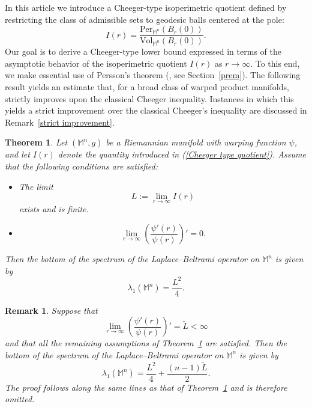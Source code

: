 \documentclass[a4paper,11pt,reqno]{amsart}
\renewcommand\eqref[1]{(\ref{#1})}
\theoremstyle{plain}
\newtheorem{theorem}{Theorem}[section]
\newtheorem{remark}{Remark}[section]
\numberwithin{equation}{section} \allowdisplaybreaks
\newcommand{\m}{\mathbb{M}^n}
\begin{document}
In this article we introduce a Cheeger-type isoperimetric quotient defined by restricting the class of admissible sets to geodesic balls centered at the pole:
\begin{equation}\label{Cheeger type quotient}
    I(r)=\frac{\text{Per}_{\m}(B_r(0))}{\text{Vol}_{\m}(B_r(0))}.
\end{equation}
Our goal is to derive a Cheeger-type lower bound expressed in terms of the asymptotic behavior of the isoperimetric quotient $I(r)$ as $r\to \infty$. To this end, we make essential use of Persson’s theorem (\cite{Persson}, see Section~\ref{prem}). The following result yields an estimate that, for a broad class of warped product manifolds, strictly improves upon the classical Cheeger inequality. Instances in which this yields a strict improvement over the classical Cheeger's inequality are discussed in Remark~\ref{strict improvement}.

\begin{theorem}\label{fourth}
Let $(\m,g)$ be a Riemannian manifold with warping function $\psi$, and let $I(r)$ denote the quantity introduced in \eqref{Cheeger type quotient}. 
Assume that the following conditions are satisfied:
\begin{itemize}
    \item[(i)] The limit 
    \[
        L := \lim_{r \to \infty} I(r)
    \]
    exists and is finite.
    
    \item[(ii)] 
    \[
        \lim_{r \to \infty} \left( \frac{\psi'(r)}{\psi(r)} \right)' = 0.
    \]
\end{itemize}
Then the bottom of the spectrum of the Laplace--Beltrami operator on $\m$ is given by
\begin{equation}\label{eq:lambda-explicit}
    \lambda_1(\m) = \frac{L^2}{4}.
\end{equation}
\end{theorem}


\medskip 


\begin{remark}
{\rm 
Suppose that 
\begin{equation*}
    \lim_{r \to \infty}\left(\frac{\psi'(r)}{\psi(r)}\right)'=\tilde{L}<\infty
\end{equation*}
and that all the remaining assumptions of Theorem~\ref{fourth} are satisfied. Then the bottom of the spectrum of the Laplace–Beltrami operator on $\m$ is given by 
\begin{equation*}
    \lambda_1(\m)= \frac{L^2}{4}+\frac{(n-1)\tilde{L}}{2}.
\end{equation*}
The proof follows along the same lines as that of Theorem~\ref{fourth} and is therefore omitted.
}
\end{remark}
\end{document}
